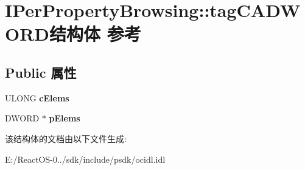 \hypertarget{struct_i_per_property_browsing_1_1tag_c_a_d_w_o_r_d}{}\section{I\+Per\+Property\+Browsing\+:\+:tag\+C\+A\+D\+W\+O\+R\+D结构体 参考}
\label{struct_i_per_property_browsing_1_1tag_c_a_d_w_o_r_d}
\subsection*{Public 属性}
\begin{DoxyCompactItemize}
\item 
\mbox{\label{struct_i_per_property_browsing_1_1tag_c_a_d_w_o_r_d_aab9264b6f4334cfff2793be194c6de57}} 
U\+L\+O\+NG {\bfseries c\+Elems}
\item 
\mbox{\label{struct_i_per_property_browsing_1_1tag_c_a_d_w_o_r_d_a57ca508c6744d868738941a0c0377387}} 
D\+W\+O\+RD $\ast$ {\bfseries p\+Elems}
\end{DoxyCompactItemize}


该结构体的文档由以下文件生成\+:\begin{DoxyCompactItemize}
\item 
E\+:/\+React\+O\+S-\/0../sdk/include/psdk/ocidl.\+idl\end{DoxyCompactItemize}
